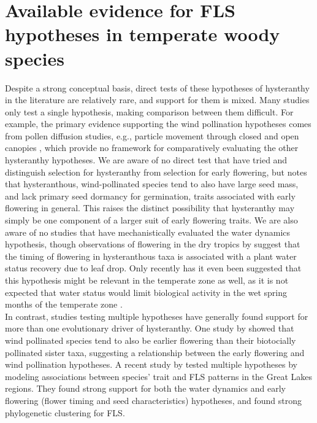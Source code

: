 \documentclass[12pt]{article}\usepackage[]{graphicx}\usepackage[]{color}
\begin{document}
\section*{Available evidence for FLS hypotheses in temperate woody species} 
\indent\indent Despite a strong conceptual basis, direct tests of these hypotheses of hysteranthy in the literature are relatively rare, and support for them is mixed. Many studies only test a single hypothesis, making comparison between them difficult. For example, the primary evidence supporting the wind pollination hypotheses comes from pollen diffusion studies, e.g., particle movement through closed and open canopies \citep{Niklas1985,Nathan2005, Milleron2012}, which provide no framework for comparatively evaluating the other hysteranthy hypotheses. We are aware of no direct test that have tried and distinguish selection for hysteranthy from selection for early flowering, but \citet{Primack1987} notes that hysteranthous, wind-pollinated species tend to also have large seed mass, and lack primary seed dormancy for germination, traits associated with early flowering in general. This raises the distinct possibility that hysteranthy may simply be one component of a larger suit of early flowering traits. We are also aware of no studies that have mechanistically evaluated the water dynamics hypothesis, though observations of flowering in the dry tropics by \citet{Borchert1983,Reich1984} suggest that the timing of flowering in hysteranthous taxa is associated with a plant water status recovery due to leaf drop. Only recently has it even been suggested that this hypothesis might be relevant in the temperate zone as well, as it is not expected that water status would limit biological activity in the wet spring months of the temperate zone \citep{Gougherty2018}.\\
\indent In contrast, studies testing multiple hypotheses have generally found support for more than one evolutionary driver of hysteranthy. One study by \citet{Bolmgren2003} showed that wind pollinated species tend to also be earlier flowering than their biotocially pollinated sister taxa, suggesting a relationship between the early flowering and wind pollination hypotheses. A recent study by \citet{Gougherty2018} tested multiple hypotheses by modeling associations between species' trait and FLS patterns in the Great Lakes regions. They found strong support for both the water dynamics and early flowering (flower timing and seed characteristics) hypotheses, and found strong phylogenetic clustering for FLS. \\
\end{document}
